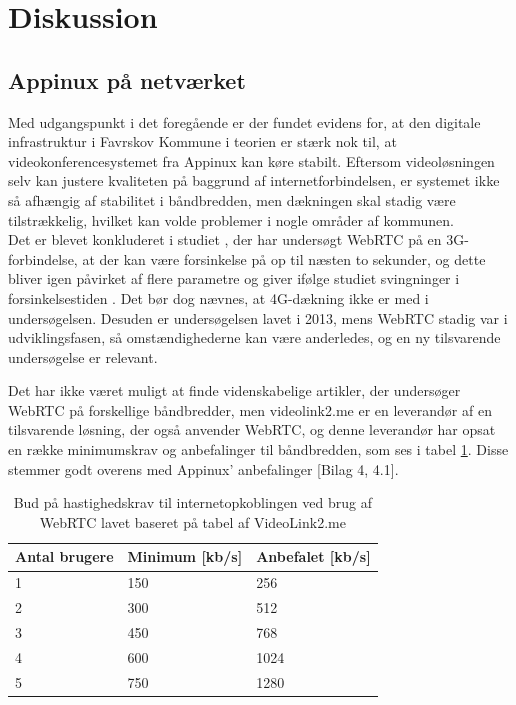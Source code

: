 \section{Diskussion}
\subsection{Appinux på netværket}
Med udgangspunkt i det foregående er der fundet evidens for, at den digitale infrastruktur i Favrskov Kommune i teorien er stærk nok til, at videokonferencesystemet fra Appinux kan køre stabilt. Eftersom videoløsningen selv kan justere kvaliteten på baggrund af internetforbindelsen, er systemet ikke så afhængig af stabilitet i båndbredden, men dækningen skal stadig være tilstrækkelig, hvilket kan volde problemer i nogle områder af kommunen.\\
Det er blevet konkluderet i studiet , der har undersøgt WebRTC på en 3G-forbindelse, at der kan være forsinkelse på op til næsten to sekunder, og dette bliver igen påvirket af flere parametre og giver ifølge studiet svingninger i forsinkelsestiden \cite{webrtcjournal}. Det bør dog nævnes, at 4G-dækning ikke er med i undersøgelsen. Desuden er undersøgelsen lavet i 2013, mens WebRTC stadig var i udviklingsfasen, så omstændighederne kan være anderledes, og en ny tilsvarende undersøgelse er relevant.

Det har ikke været muligt at finde videnskabelige artikler, der undersøger WebRTC på forskellige båndbredder, men videolink2.me er en leverandør af en tilsvarende løsning, der også anvender WebRTC, og denne leverandør har opsat en række minimumskrav og anbefalinger til båndbredden, som ses i tabel \ref{tab:hastighedtabel}. Disse stemmer godt overens med Appinux' anbefalinger [Bilag 4, 4.1].
\begin{table}[H]
\caption{Bud på hastighedskrav til internetopkoblingen ved brug af WebRTC lavet baseret på tabel af VideoLink2.me \cite{videolink2me}}
\label{tab:hastighedtabel}
\centering
\begin{tabular}{|l|l|l|}
\hline
\textbf{Antal brugere} & \textbf{Minimum} [kb/s]  & \textbf{Anbefalet}  [kb/s] \\ \hline
1             & 150          & 256          \\ \hline
2             & 300          & 512          \\ \hline
3             & 450          & 768          \\ \hline
4             & 600          & 1024          \\ \hline
5             & 750          & 1280          \\ \hline
\end{tabular}

\end{table}

